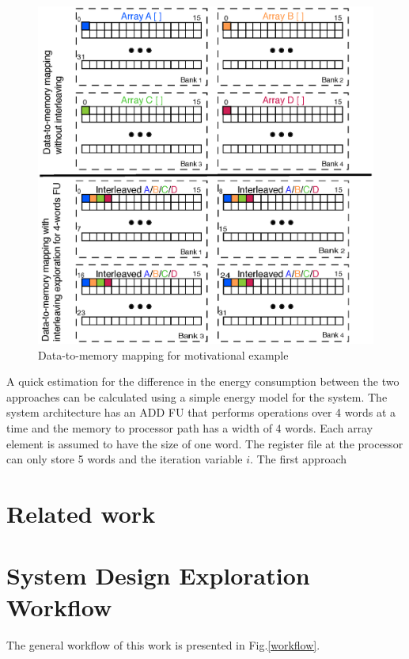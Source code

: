 \documentclass[prodmode,acmtodaes]{acmsmall}
\begin{document}
\begin{figure}
\centering
	\label{motivation}
	\caption{Data-to-memory mapping for motivational example}
	\includegraphics[scale = 0.5]{Images/motivation.eps}
\end{figure}

A quick estimation for the difference in the energy consumption between the two approaches can be calculated using a simple energy model for the system.
The system architecture has an ADD FU that performs operations over 4 words at a time and the memory to processor path has a width of 4 words. 
Each array element is assumed to have the size of one word.
The register file at the processor can only store 5 words and the iteration variable $i$.
The first approach 

\section{Related work}



\section{System Design Exploration Workflow}

The general workflow of this work is presented in Fig.\ref{workflow}.
\end{document}
